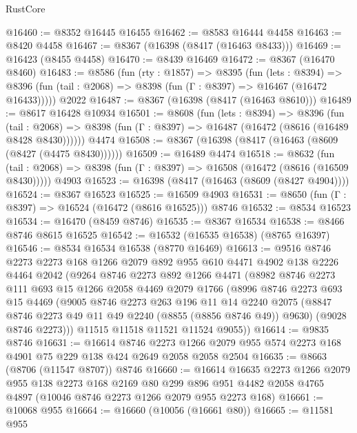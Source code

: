 \begin{lexlean}{RustCore}
\begin{coremodule}
@16460 := @8352 @16445 @16455
@16462 := @8583 @16444 @4458
@16463 := @8420 @4458
@16467 := @8367 (@16398 (@8417 (@16463 @8433)))
@16469 := @16423 (@8455 @4458)
@16470 := @8439 @16469
@16472 := @8367 (@16470 @8460)
@16483 := @8586
    (fun (rty : @1857) =>
    @8395
      (fun (lets : @8394) =>
      @8396 (fun (tail : @2068) => @8398 (fun (Γ : @8397) => @16467 (@16472 @16433)))))
    @2022
@16487 := @8367 (@16398 (@8417 (@16463 @8610)))
@16489 := @8617 @16428 @10934
@16501 := @8608
    (fun (lets : @8394) =>
    @8396
      (fun (tail : @2068) =>
      @8398 (fun (Γ : @8397) => @16487 (@16472 (@8616 (@16489 @8428 @8430))))))
    @4474
@16508 := @8367 (@16398 (@8417 (@16463 (@8609 (@8427 (@4475 @8430))))))
@16509 := @16489 @4474
@16518 := @8632
    (fun (tail : @2068) => @8398 (fun (Γ : @8397) => @16508 (@16472 (@8616 (@16509 @8430)))))
    @4903
@16523 := @16398 (@8417 (@16463 (@8609 (@8427 @4904))))
@16524 := @8367 @16523
@16525 := @16509 @4903
@16531 := @8650 (fun (Γ : @8397) => @16524 (@16472 (@8616 @16525))) @8746
@16532 := @8534 @16523
@16534 := @16470 (@8459 @8746)
@16535 := @8367 @16534
@16538 := @8466 @8746 @8615 @16525
@16542 := @16532 (@16535 @16538) (@8765 @16397)
@16546 := @8534 @16534 @16538 (@8770 @16469)
@16613 := @9516
    @8746
    @2273
    @2273
    @168
    @1266
    @2079
    @892
    @955
    @610
    @4471
    @4902
    @138
    @2226
    @4464
    @2042
    (@9264
      @8746
      @2273
      @892
      @1266
      @4471
      (@8982
        @8746
        @2273
        @111
        @693
        @15
        @1266
        @2058
        @4469
        @2079
        @1766
        (@8996
          @8746
          @2273
          @693
          @15
          @4469
          (@9005
            @8746
            @2273
            @263
            @196
            @11
            @14
            @2240
            @2075
            (@8847 @8746 @2273 @49 @11 @49 @2240 (@8855 (@8856 @8746 @49)) @9630)
            (@9028 @8746 @2273)))
        @11515
        @11518
        @11521
        @11524
        @9055))
@16614 := @9835 @8746
@16631 := @16614
    @8746
    @2273
    @1266
    @2079
    @955
    @574
    @2273
    @168
    @4901
    @75
    @229
    @138
    @424
    @2649
    @2058
    @2058
    @2504
@16635 := @8663 (@8706 (@11547 @8707)) @8746
@16660 := @16614
    @16635
    @2273
    @1266
    @2079
    @955
    @138
    @2273
    @168
    @2169
    @80
    @299
    @896
    @951
    @4482
    @2058
    @4765
    @4897
    (@10046 @8746 @2273 @1266 @2079 @955 @2273 @168)
@16661 := @10068 @955
@16664 := @16660 (@10056 (@16661 @80))
@16665 := @11581 @955

\end{coremodule}
\end{lexlean}
